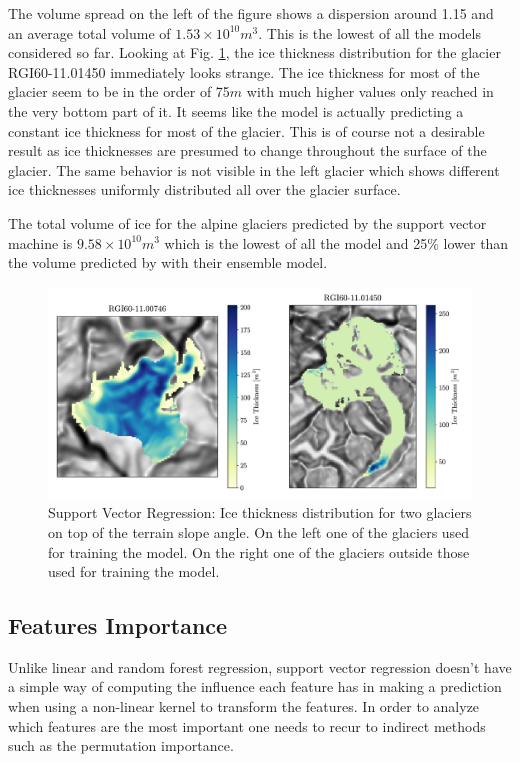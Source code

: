 The volume spread on the left of the figure shows a dispersion around 1.15 and an average total volume of $1.53 \times 10^{10}m^3$. This is the lowest of all the models considered so far. 
Looking at Fig. \ref{fig:svr-map}, the ice thickness distribution for the glacier RGI60-11.01450 immediately looks strange. The ice thickness for most of the glacier seem to be in the order of 75$m$ with much higher values only reached in the very bottom part of it. It seems like the model is actually predicting a constant ice thickness for most of the glacier. This is of course not a desirable result as ice thicknesses are presumed to change throughout the surface of the glacier. The same behavior is not visible in the left glacier which shows different ice thicknesses uniformly distributed all over the glacier surface.

The total volume of ice for the alpine glaciers predicted by the support vector machine is $9.58 \times 10^{10}m^3$ which is the lowest of all the model and 25\% lower than the volume predicted by \citet{Farinotti2019} with their ensemble model.

\begin{figure}[!tp]
	\centering		  
	\includegraphics[width=1.\textwidth]{figures/SVR_thick_map.pdf}
	\caption{Support Vector Regression: Ice thickness distribution for two glaciers on top of the terrain slope angle. On the left one of the glaciers used for training the model. On the right one of the glaciers outside those used for training the model.}
	\label{fig:svr-map}
\end{figure}

\subsection{Features Importance}\label{svr-features}
Unlike linear and random forest regression, support vector regression doesn't have a simple way of computing the influence each feature has in making a prediction when using a non-linear kernel to transform the features. In order to analyze which features are the most important one needs to recur to indirect methods such as the permutation importance.


